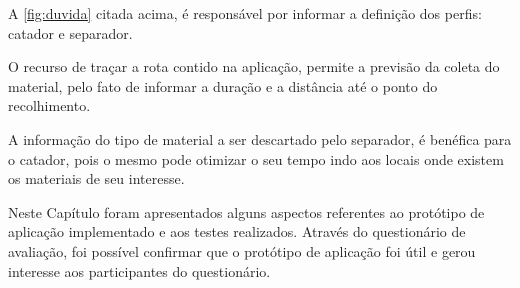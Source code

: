 A \autoref{fig:duvida} citada acima, é responsável por informar a definição dos perfis: catador e separador.

O recurso de traçar a rota contido na aplicação, permite a previsão da coleta do material, pelo fato de informar a duração e a distância até o ponto do recolhimento.

A informação do tipo de material a ser descartado pelo separador, é benéfica para o catador, pois o mesmo pode otimizar o seu tempo indo aos locais onde existem os materiais de seu interesse.

Neste Capítulo foram apresentados alguns aspectos referentes ao protótipo de aplicação implementado e aos testes realizados. Através do questionário de avaliação, foi possível confirmar que o protótipo de aplicação  foi útil e gerou interesse aos participantes do questionário.
